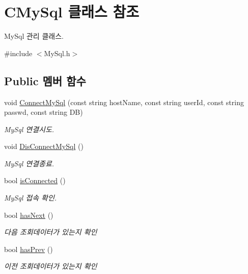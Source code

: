 \hypertarget{classCMySql}{
\section{CMySql 클래스 참조}
\label{classCMySql}
}


MySql 관리 클래스.  


{\ttfamily \#include $<$MySql.h$>$}\subsection*{Public 멤버 함수}
\begin{DoxyCompactItemize}
\item 
void \hyperlink{classCMySql_a0b2f602fc0a7b291d4a0cec59fa76124}{ConnectMySql} (const string hostName, const string userId, const string passwd, const string DB)
\begin{DoxyCompactList}\small\item\em MySql 연결시도. \item\end{DoxyCompactList}\item 
void \hyperlink{classCMySql_a20481aded19016f0d1b0eaf8d27aa558}{DisConnectMySql} ()
\begin{DoxyCompactList}\small\item\em MySql 연결종료. \item\end{DoxyCompactList}\item 
bool \hyperlink{classCMySql_a5be8786b07864ba655ef55378f66ada7}{isConnected} ()
\begin{DoxyCompactList}\small\item\em MySql 접속 확인. \item\end{DoxyCompactList}\item 
bool \hyperlink{classCMySql_a4d3029d73d2b9601a4bb800721c3974d}{hasNext} ()
\begin{DoxyCompactList}\small\item\em 다음 조회데이터가 있는지 확인 \item\end{DoxyCompactList}\item 
bool \hyperlink{classCMySql_af7eb82330c5e96fd76d740654639aa40}{hasPrev} ()
\begin{DoxyCompactList}\small\item\em 이전 조회데이터가 있는지 확인 \item\end{DoxyCompactList}\item 

\end{DoxyCompactItemize}
